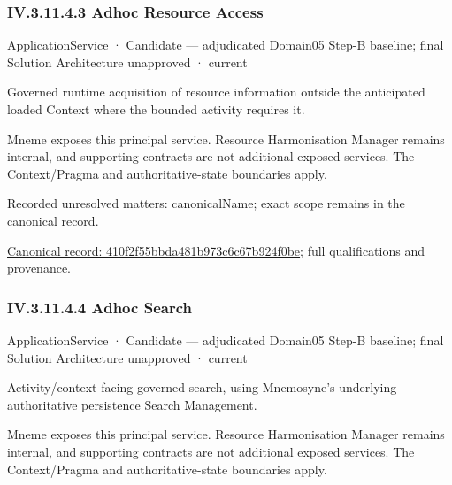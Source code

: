 \subsubsection*{IV.3.11.4.3 Adhoc Resource Access}
\label{navigation:IV.3.11.4.3}

\label{element:410f2f55bbda481b973c6c67b924f0be}
{\small ApplicationService · Candidate — adjudicated Domain05 Step-B baseline; final Solution Architecture unapproved · current}\par

Governed runtime acquisition of resource information outside the anticipated loaded Context where the bounded activity requires it.



Mneme exposes this principal service. Resource Harmonisation Manager remains internal, and supporting contracts are not additional exposed services. The Context/Pragma and authoritative-state boundaries apply.


{\small Recorded unresolved matters: canonicalName; exact scope remains in the canonical record.}\par
{\footnotesize \href{../../../../continuum/application/application-service/410f2f55bbda481b973c6c67b924f0be.md}{Canonical record: 410f2f55bbda481b973c6c67b924f0be}; full qualifications and provenance.}\par
\subsubsection*{IV.3.11.4.4 Adhoc Search}
\label{navigation:IV.3.11.4.4}

\label{element:02bf54d699b44ed0b26fa5b8125f0f01}
{\small ApplicationService · Candidate — adjudicated Domain05 Step-B baseline; final Solution Architecture unapproved · current}\par

Activity/context-facing governed search, using Mnemosyne's underlying authoritative persistence Search Management.



Mneme exposes this principal service. Resource Harmonisation Manager remains internal, and supporting contracts are not additional exposed services. The Context/Pragma and authoritative-state boundaries apply.


